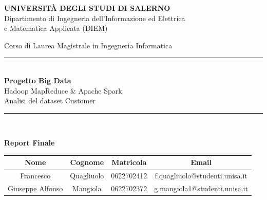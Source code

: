 \documentclass[a4paper, 12pt, oneside]{report}
\begin{document}
\begin{titlepage}
    \thispagestyle{empty}
    \begin{center}
        \vspace*{0.5cm}

        \LARGE{\textbf{UNIVERSIT\`A DEGLI STUDI DI SALERNO}}\\
        \vspace{3mm}
        \large{Dipartimento di Ingegneria dell'Informazione ed Elettrica\\e Matematica Applicata (DIEM)}\\

        \vspace{1cm}

        \large{Corso di Laurea Magistrale in Ingegneria Informatica}\\

        \vspace{1.2cm}
        
        \rule{\textwidth}{1pt}\\
        \vspace{5mm}
        {\Huge\textbf{Progetto Big Data}}\\
        \vspace{3mm}
        {\LARGE Hadoop MapReduce \& Apache Spark}\\
        \vspace{3mm}
        {\Large Analisi del dataset Customer}\\
        \vspace{5mm}
        \rule{\textwidth}{1pt}\\
        
        \vspace{1.5cm}

        {\Large\textbf{Report Finale}}\\

        \vspace{1cm}

        \begin{tabular}{|c|c|c|c|}
            \hline
            \textbf{Nome} & \textbf{Cognome} & \textbf{Matricola} & \textbf{Email} \\
            \hline
            Francesco & Quagliuolo & 0622702412 & f.quagliuolo@studenti.unisa.it \\
            \hline
            Giuseppe Alfonso & Mangiola & 0622702372 & g.mangiola1@studenti.unisa.it \\
            \hline
        \end{tabular}


\end{center}
\end{titlepage}
\end{document}
